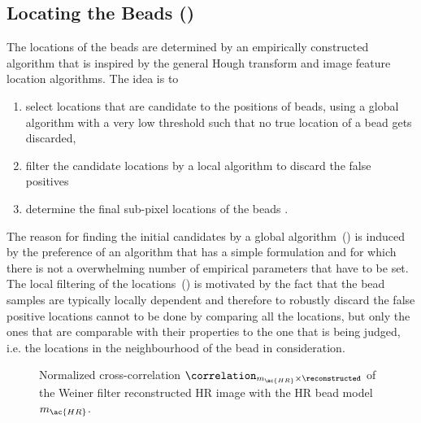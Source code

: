 \subsection{Locating the Beads ()}%

The locations of the beads are determined by an empirically constructed algorithm that is inspired by the general Hough
    transform and image feature location algorithms.
The idea is to
    \begin{enumerate}[label=\roman*.]
        \item select locations that are candidate to the positions of beads, using a global algorithm with a very low 
            threshold such that no true location of a bead gets discarded, 
        \item filter the candidate locations by a local algorithm to discard the false positives 
        \item determine the final sub-pixel locations of the beads .
    \end{enumerate}
The reason for finding the initial candidates by a global algorithm~() is induced by the 
    preference of an algorithm that has a simple formulation and for which there is not a overwhelming number of 
    empirical parameters that have to be set.
The local filtering of the locations~() is motivated by the fact that the bead samples are 
    typically locally dependent and therefore to robustly discard the false positive locations cannot to be done by 
    comparing all the locations, but only the ones that are comparable with their properties to the one that is being 
    judged, i.e. the locations in the neighbourhood of the bead in consideration.



%
\begin{figure}
    \caption{%
        Normalized cross-correlation \(\correlation_{m_{\ac{HR}} \times \reconstructed}\) of the Weiner filter 
        reconstructed \ac{HR} image with the \ac{HR} bead model \(m_{\ac{HR}}\).
        }
\end{figure}
%

